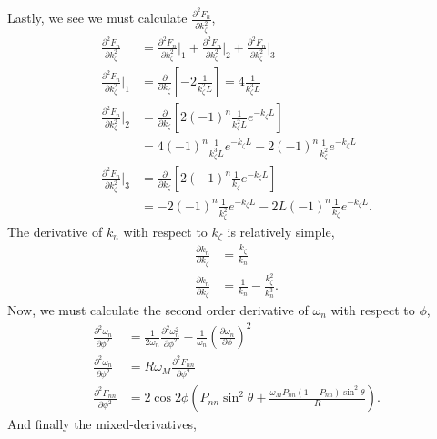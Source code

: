 \documentclass{article}
\begin{document}
Lastly, we see we must calculate $\frac{\partial^2 F_{n}}{\partial k_{\zeta}^2}$,
\begin{align}
\frac{\partial^2 F_{n}}{\partial k_{\zeta}^2} &= \frac{\partial^2 F_{n}}{\partial k_{\zeta}^2}\bigg|_{1} + \frac{\partial^2 F_{n}}{\partial k_{\zeta}^2}\bigg|_{2} + \frac{\partial^2 F_{n}}{\partial k_{\zeta}^2}\bigg|_{3} \\
\frac{\partial^2 F_{n}}{\partial k_{\zeta}^2}\bigg|_{1} &= \frac{\partial}{\partial k_{\zeta}} \left[-2 \frac{1}{k_{\zeta}^2L} \right]= 4 \frac{1}{k_{\zeta}^3 L} \\
\frac{\partial^2 F_{n}}{\partial k_{\zeta}^2}\bigg|_{2} &= \frac{\partial}{\partial k_{\zeta}} \left[ 2 (-1)^n \frac{1}{k_{\zeta}^2 L} e^{-k_{\zeta} L } \right] \\
&= 4 (-1)^n \frac{1}{k_{\zeta}^3 L} e^{-k_{\zeta} L} - 2 (-1)^n \frac{1}{k_{\zeta}^2} e^{- k_{\zeta} L} \\
\frac{\partial^2 F_{n}}{\partial k_{\zeta}^2}\bigg|_{3} &= \frac{\partial}{\partial k_{\zeta}} \left[ 2 (-1)^n \frac{1}{k_{\zeta}} e^{- k_{\zeta} L } \right] \\
&= -2 (-1)^n \frac{1}{k_{\zeta}^2} e^{- k_{\zeta} L } - 2L (-1)^n \frac{1}{k_{\zeta}} e^{- k_{\zeta} L}.
\end{align}
The derivative of $k_{n}$ with respect to $k_{\zeta}$ is relatively simple,
\begin{align}
\frac{\partial k_{n}}{\partial k_{\zeta}} &= \frac{k_{\zeta}}{k_{n}} \\
\frac{\partial k_{n}}{\partial k_{\zeta}} &= \frac{1}{k_{n}} - \frac{k_{\zeta}^2}{k_{n}^3}.
\end{align}
Now, we must calculate the second order derivative of $\omega_{n}$ with respect to $\phi$,
\begin{align}
\frac{\partial^2 \omega_{n}}{\partial \phi^2} &= \frac{1}{2 \omega_{n}} \frac{\partial^2 \omega_{n}^2}{\partial \phi^2} - \frac{1}{\omega_{n}} \left(\frac{\partial \omega_{n}}{\partial \phi}\right)^2 \\
\frac{\partial^2 \omega_{n}}{\partial \phi^2} &= R \omega_{M} \frac{\partial^2 F_{nn}}{\partial \phi^2} \\
\frac{\partial^2 F_{nn}}{\partial \phi^2} &= 2 \cos{2\phi} \left( P_{nn} \sin^2{\theta} + \frac{\omega_{M} P_{nn} (1-P_{nn}) \sin^2{\theta}}{R} \right).
\end{align}
And finally the mixed-derivatives,
\end{document}
